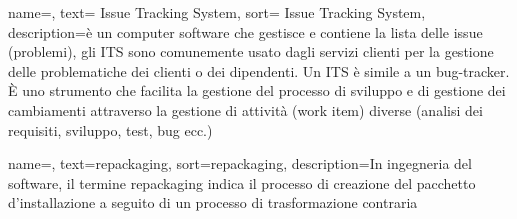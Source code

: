 {
name=,
text= Issue Tracking System,
sort= Issue Tracking System,
description={è un computer software che gestisce e contiene la lista delle issue (problemi), gli ITS sono comunemente usato dagli servizi clienti per la gestione delle problematiche dei clienti o dei dipendenti.
Un ITS è simile a un bug-tracker.
È uno strumento che facilita la gestione del processo di sviluppo e di gestione dei cambiamenti attraverso la gestione di attività (work item) diverse (analisi dei requisiti, sviluppo, test, bug ecc.)}
}





{
name=,
text=repackaging,
sort=repackaging,
description={In ingegneria del software, il termine repackaging indica il processo di creazione del pacchetto d'installazione a seguito di un processo di trasformazione contraria}
}

